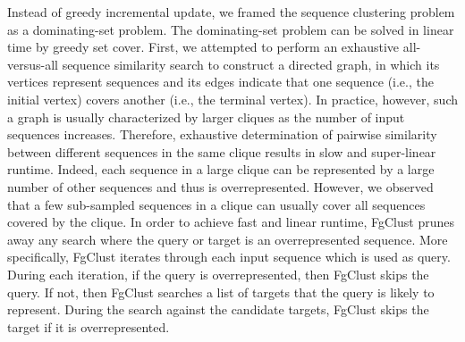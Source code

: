 \documentclass[11pt,letterpaper]{llncs2e/llncs}
\begin{document}

Instead of greedy incremental update, we framed the sequence clustering problem as a dominating-set problem.
The dominating-set problem can be solved in linear time by greedy set cover.
First, we attempted to perform an exhaustive all-versus-all sequence similarity search to construct a directed graph, in which its vertices represent sequences and its edges indicate that one sequence (i.e., the initial vertex) covers another (i.e., the terminal vertex).
In practice, however, such a graph is usually characterized by larger cliques as the number of input sequences increases.
Therefore, exhaustive determination of pairwise similarity between different sequences in the same clique results in slow and super-linear runtime.
Indeed, each sequence in a large clique can be represented by a large number of other sequences and thus is overrepresented.
However, we observed that a few sub-sampled sequences in a clique can usually cover all sequences covered by the clique.
In order to achieve fast and linear runtime, FgClust prunes away any search where the query or target is an overrepresented sequence.
More specifically, FgClust iterates through each input sequence which is used as query.
During each iteration, if the query is overrepresented, then FgClust skips the query.
If not, then FgClust searches a list of targets that the query is likely to represent.
During the search against the candidate targets, FgClust skips the target if it is overrepresented.
\end{document}

